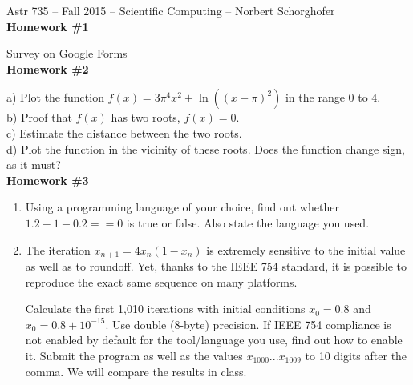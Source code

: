 \documentclass[12pt]{article}
\begin{document}
\setlength\parindent{0cm}

Astr 735 -- Fall 2015 -- Scientific Computing -- Norbert Schorghofer\\


{\bf Homework \#1}

Survey on Google Forms\\

{\bf Homework \#2}

a) Plot the function  $f(x) = 3 \pi^4 x^2+\ln((x-\pi)^2)$ in the range 0 to 4.\\   %
b) Proof that $f(x)$ has two roots, $f(x)=0$.\\
c) Estimate the distance between the two roots. \\
d) Plot the function in the vicinity of these roots.  Does the function change sign, as it must?\\



{\bf Homework \#3}

\begin{enumerate}
\item
Using a programming language of your choice, find out whether
$1.2-1-0.2==0$ is true or false. Also state the language you used.

\item
The iteration $x_{n+1} = 4x_n (1-x_n)$ is extremely sensitive to the initial value as well as to roundoff. Yet, thanks to the IEEE 754 standard, it is possible to reproduce the exact same sequence on many platforms.

Calculate the first 1,010 iterations with initial conditions $x_0=0.8$ and $x_0 = 0.8+10^{-15}$. Use double (8-byte) precision.  
If IEEE 754 compliance is not enabled by default for the tool/language you use, find out how to enable it. 
Submit the program as well as the values $x_{1000} ... x_{1009}$ to 10 digits after the comma.
We will compare the results in class.

\end{enumerate}
\end{document}
